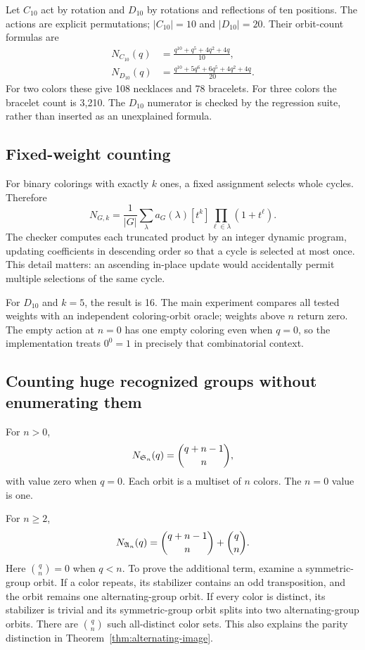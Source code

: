 \begin{example}
Let $C_{10}$ act by rotation and $D_{10}$ by rotations and reflections of ten positions. The actions are explicit permutations; $|C_{10}|=10$ and $|D_{10}|=20$. Their orbit-count formulas are
\begin{align*}
 N_{C_{10}}(q)&=\frac{q^{10}+q^5+4q^2+4q}{10},\\
 N_{D_{10}}(q)&=\frac{q^{10}+5q^6+6q^5+4q^2+4q}{20}.
\end{align*}
For two colors these give 108 necklaces and 78 bracelets. For three colors the bracelet count is 3,210. The $D_{10}$ numerator is checked by the regression suite, rather than inserted as an unexplained formula.
\end{example}

\subsection{Fixed-weight counting}
For binary colorings with exactly $k$ ones, a fixed assignment selects whole cycles. Therefore
\begin{equation}
 N_{G,k}=\frac1{|G|}\sum_{\lambda}a_G(\lambda)
 [t^k]\prod_{\ell\in\lambda}(1+t^\ell).
 \label{eq:weight}
\end{equation}
The checker computes each truncated product by an integer dynamic program, updating coefficients in descending order so that a cycle is selected at most once. This detail matters: an ascending in-place update would accidentally permit multiple selections of the same cycle.

For $D_{10}$ and $k=5$, the result is 16. The main experiment compares all tested weights with an independent coloring-orbit oracle; weights above $n$ return zero. The empty action at $n=0$ has one empty coloring even when $q=0$, so the implementation treats $0^0=1$ in precisely that combinatorial context.

\subsection{Counting huge recognized groups without enumerating them}
For $n>0$,
\begin{equation}
 N_{\mathfrak S_n}(q)=\binom{q+n-1}{n},
 \label{eq:symmetric-count}
\end{equation}
with value zero when $q=0$. Each orbit is a multiset of $n$ colors. The $n=0$ value is one.

For $n\geq2$,
\begin{equation}
 N_{\mathfrak A_n}(q)=\binom{q+n-1}{n}+\binom qn.
 \label{eq:alternating-count}
\end{equation}
Here $\binom qn=0$ when $q<n$. To prove the additional term, examine a symmetric-group orbit. If a color repeats, its stabilizer contains an odd transposition, and the orbit remains one alternating-group orbit. If every color is distinct, its stabilizer is trivial and its symmetric-group orbit splits into two alternating-group orbits. There are $\binom qn$ such all-distinct color sets. This also explains the parity distinction in Theorem~\ref{thm:alternating-image}.

